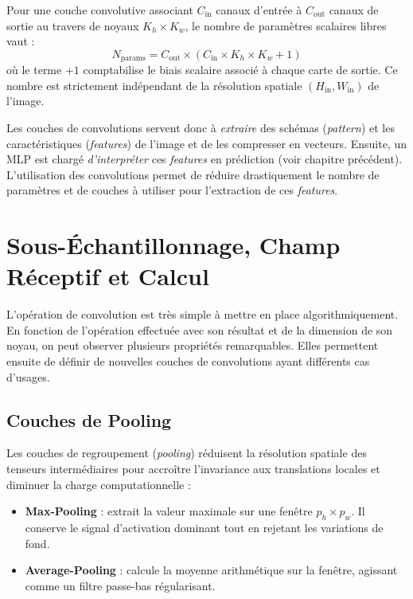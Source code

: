 \begin{proposition}
    Pour une couche convolutive associant $C_{\mathrm{in}}$ canaux d'entrée à $C_{\mathrm{out}}$ canaux de sortie au travers de noyaux $K_h \times K_w$, le nombre de paramètres scalaires libres vaut :
    \begin{equation}
        N_{\mathrm{params}} = C_{\mathrm{out}} \times \left( C_{\mathrm{in}} \times K_h \times K_w + 1 \right)
    \end{equation}
    où le terme $+1$ comptabilise le biais scalaire associé à chaque carte de sortie. Ce nombre est strictement indépendant de la résolution spatiale $(H_{\mathrm{in}}, W_{\mathrm{in}})$ de l'image.
\end{proposition}

\begin{remark}
    Les couches de convolutions servent donc à \emph{extraire} des schémas (\emph{pattern}) et les caractéristiques (\emph{features}) de l'image et de les compresser en vecteurs. 
    Ensuite, un MLP est chargé \emph{d'interpréter} ces \emph{features} en prédiction (voir chapitre précédent). L'utilisation des convolutions permet de réduire drastiquement le nombre de paramètres et de couches à utiliser pour l'extraction de ces \emph{features}. 
\end{remark}


\section{Sous-Échantillonnage, Champ Réceptif et Calcul}

L'opération de convolution est très simple à mettre en place algorithmiquement. En fonction de l'opération effectuée avec son résultat et de la dimension de son noyau, on peut observer plusieurs propriétés remarquables. Elles permettent ensuite de définir de nouvelles couches de convolutions ayant différents cas d'usages. 

\subsection{Couches de Pooling}

Les couches de regroupement (\emph{pooling}) réduisent la résolution spatiale des tenseurs intermédiaires pour accroître l'invariance aux translations locales et diminuer la charge computationnelle :
\begin{itemize}
    \item \textbf{Max-Pooling} : extrait la valeur maximale sur une fenêtre $p_h \times p_w$. Il conserve le signal d'activation dominant tout en rejetant les variations de fond.
    \item \textbf{Average-Pooling} : calcule la moyenne arithmétique sur la fenêtre, agissant comme un filtre passe-bas régularisant.
\end{itemize}

